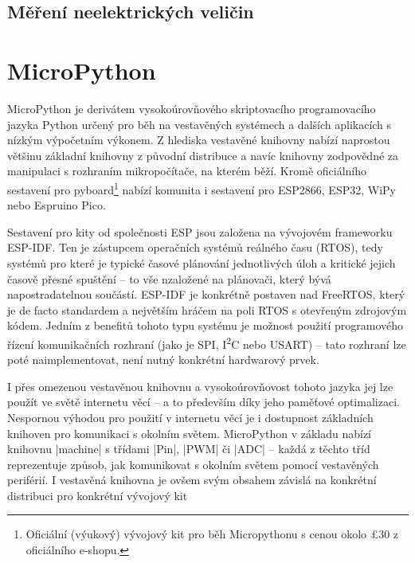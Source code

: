 
\subsection{Měření neelektrických veličin}

\section{MicroPython}\label{sec:micropython}
MicroPython je derivátem vysokoúrovňového skriptovacího programovacího jazyka Python určený pro běh na vestavěných systémech a dalších
aplikacích s nízkým výpočetním výkonem.
Z hlediska vestavěné knihovny nabízí naprostou většinu základní knihovny z původní distribuce a navíc knihovny
zodpovědné za manipulaci s rozhraním mikropočítače, na kterém běží.
Kromě oficiálního sestavení pro pyboard\footnote{Oficiální (výukový) vývojový kit pro běh Micropythonu s
cenou okolo \pounds30 z oficiálního e-shopu.} nabízí komunita i sestavení pro ESP2866, ESP32, WiPy nebo Espruino Pico.

Sestavení pro kity od společnosti ESP jsou založena na vývojovém frameworku ESP-IDF.
Ten je zástupcem operačních systémů reálného času (RTOS), tedy systémů pro které je typické časové plánování jednotlivých úloh
a kritické jejich časově přesné spuštění -- to vše nzaložené na plánovači, který bývá napostradatelnou součástí.
ESP-IDF je konkrétně postaven nad FreeRTOS, který je de facto standardem a největším hráčem na poli RTOS s otevřeným
zdrojovým kódem. 
Jedním z benefitů tohoto typu systému je možnost použití programového řízení komunikačních rozhraní
(jako je SPI, I\textsuperscript{2}C nebo USART) -- tato rozhraní lze poté naimplementovat, není nutný konkrétní hardwarový prvek.

I přes omezenou vestavěnou knihovnu a vysokoúrovňovost tohoto jazyka jej lze použít ve světě internetu věcí --
a to především díky jeho paměťové optimalizaci.
Nespornou výhodou pro použití v internetu věcí je i dostupnost základních knihoven pro komunikaci s okolním světem.
MicroPython v základu nabízí knihovnu \ic|machine| s třídami \ic|Pin|, \ic|PWM| či \ic|ADC| --
každá z těchto tříd reprezentuje způsob, jak komunikovat s okolním světem pomocí vestavěných periférií.
I vestavěná knihovna je ovšem svým obsahem závislá na konkrétní distribuci pro konkrétní vývojový kit

